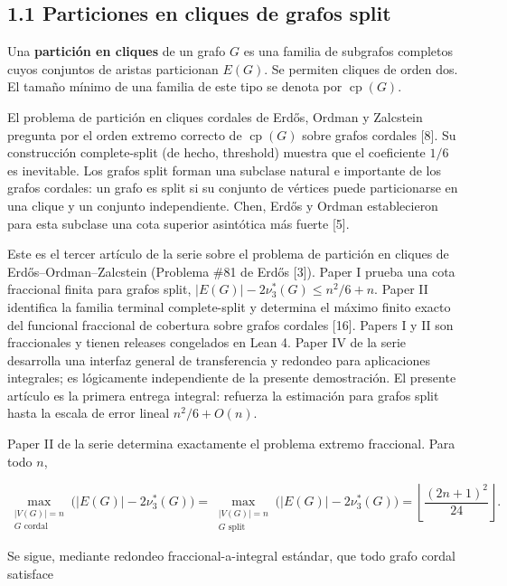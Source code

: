 \documentclass[
  11pt,
]{article}
\begin{document}
\subsection{1.1 Particiones en cliques de grafos
split}\label{particiones-en-cliques-de-grafos-split}

Una \textbf{partición en cliques} de un grafo \(G\) es una familia de
subgrafos completos cuyos conjuntos de aristas particionan \(E(G)\). Se
permiten cliques de orden dos. El tamaño mínimo de una familia de este
tipo se denota por \(\operatorname{cp}(G)\).

El problema de partición en cliques cordales de Erdős, Ordman y
Zalcstein pregunta por el orden extremo correcto de
\(\operatorname{cp}(G)\) sobre grafos cordales {[}8{]}. Su construcción
complete-split (de hecho, threshold) muestra que el coeficiente \(1/6\)
es inevitable. Los grafos split forman una subclase natural e importante
de los grafos cordales: un grafo es split si su conjunto de vértices
puede particionarse en una clique y un conjunto independiente. Chen,
Erdős y Ordman establecieron para esta subclase una cota superior
asintótica más fuerte {[}5{]}.

Este es el tercer artículo de la serie sobre el problema de partición en
cliques de Erdős--Ordman--Zalcstein (Problema \#81 de Erdős {[}3{]}).
Paper I prueba una cota fraccional finita para grafos split,
\(|E(G)|-2\nu_3^*(G)\le n^2/6+n\). Paper II identifica la familia
terminal complete-split y determina el máximo finito exacto del
funcional fraccional de cobertura sobre grafos cordales {[}16{]}. Papers
I y II son fraccionales y tienen releases congelados en Lean 4. Paper IV
de la serie desarrolla una interfaz general de transferencia y redondeo
para aplicaciones integrales; es lógicamente independiente de la
presente demostración. El presente artículo es la primera entrega
integral: refuerza la estimación para grafos split hasta la escala de
error lineal \(n^2/6+O(n)\).

Paper II de la serie determina exactamente el problema extremo
fraccional. Para todo \(n\),

\[
\max_{\substack{|V(G)|=n\\G\text{ cordal}}}
\bigl(|E(G)|-2\nu_3^*(G)\bigr)
=
\max_{\substack{|V(G)|=n\\G\text{ split}}}
\bigl(|E(G)|-2\nu_3^*(G)\bigr)
=
\left\lfloor\frac{(2n+1)^2}{24}\right\rfloor.
\]

Se sigue, mediante redondeo fraccional-a-integral estándar, que todo
grafo cordal satisface
\end{document}
